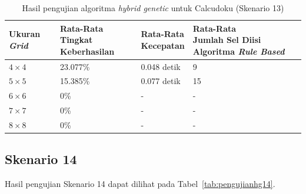 \begin{table}
\centering
\captionsetup{justification=centering}
\caption[Hasil pengujian algoritma \textit{hybrid genetic} untuk Calcudoku (Skenario 13)]{Hasil pengujian algoritma \textit{hybrid genetic} untuk Calcudoku (Skenario 13)}
\begin{tabular}{| l | l | l | l |}
\hline
Ukuran \textit{Grid} & \makecell[c]{Rata-Rata \\ Tingkat Keberhasilan} & \makecell[c]{Rata-Rata \\ Kecepatan} & \makecell[c]{Rata-Rata \\ Jumlah Sel Diisi Algoritma \textit{Rule Based}} \\
\hline \hline
\begin{math}4 \times 4\end{math} & 23.077\% & 0.048 detik & 9 \\
\hline
\begin{math}5 \times 5\end{math} & 15.385\% & 0.077 detik & 15 \\
\hline
\begin{math}6 \times 6\end{math} & 0\% & - & - \\
\hline
\begin{math}7 \times 7\end{math} & 0\% & - & - \\
\hline
\begin{math}8 \times 8\end{math} & 0\% & - & - \\
\hline
\end{tabular}
\label{tab:pengujianhg13}
\end{table}

\clearpage

\subsection{Skenario 14}
\label{sec:skenario14}

Hasil pengujian Skenario 14 dapat dilihat pada Tabel~\ref{tab:pengujianhg14}.

